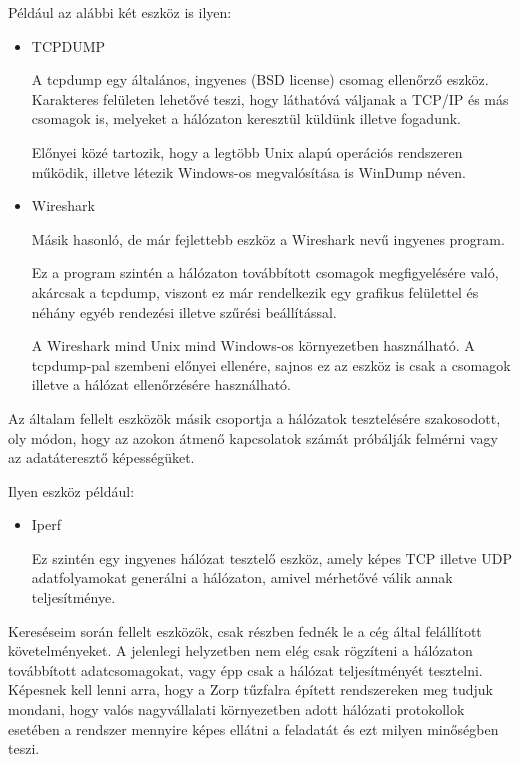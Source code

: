 \documentclass[a4paper,12pt,oneside]{report}
\begin{document}
Például az alábbi két eszköz is ilyen:
\begin{itemize}
    \item TCPDUMP \cite{website:tcpdump}
        
        A tcpdump egy általános, ingyenes (BSD license) csomag ellenőrző eszköz. Karakteres felületen lehetővé teszi, hogy láthatóvá váljanak a TCP/IP és más csomagok is, melyeket a hálózaton keresztül küldünk illetve fogadunk.
        
        Előnyei közé tartozik, hogy a legtöbb Unix alapú operációs rendszeren működik, illetve létezik Windows-os megvalósítása is WinDump néven.

    \item Wireshark \cite{website:wireshark}
        
Másik hasonló, de már fejlettebb eszköz a Wireshark nevű ingyenes program.

Ez a program szintén a hálózaton továbbított csomagok megfigyelésére való, akárcsak a tcpdump, viszont ez már rendelkezik egy grafikus felülettel és néhány egyéb rendezési illetve szűrési beállítással.

A Wireshark mind Unix mind Windows-os környezetben használható.
A tcpdump-pal szembeni előnyei ellenére, sajnos ez az eszköz is csak a csomagok illetve a hálózat ellenőrzésére használható.
        
\end{itemize}

Az általam fellelt eszközök másik csoportja a hálózatok tesztelésére szakosodott, oly módon,
hogy az azokon átmenő kapcsolatok számát próbálják felmérni vagy az adatáteresztő képességüket.

Ilyen eszköz például:
\begin{itemize}
\item Iperf \cite{website:iperf}

Ez szintén egy ingyenes hálózat tesztelő eszköz, amely képes TCP illetve UDP adatfolyamokat generálni a hálózaton, amivel mérhetővé válik annak teljesítménye.
\end{itemize}

Kereséseim során fellelt eszközök, csak részben fednék le a cég által felállított követelményeket.
A jelenlegi helyzetben nem elég csak rögzíteni a hálózaton továbbított adatcsomagokat, vagy épp csak a hálózat teljesítményét tesztelni.
Képesnek kell lenni arra, hogy a Zorp tűzfalra épített rendszereken meg tudjuk mondani, hogy valós nagyvállalati környezetben adott hálózati protokollok esetében a rendszer mennyire képes ellátni a feladatát és ezt milyen minőségben teszi.
\end{document}

